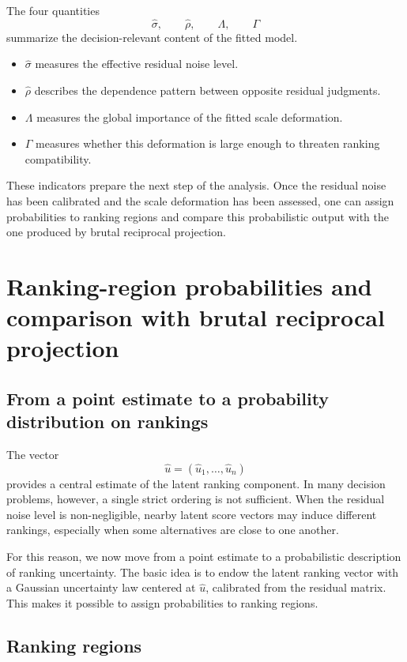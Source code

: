 \documentclass[11pt]{amsart}
\theoremstyle{definition}
\theoremstyle{plain}
\numberwithin{equation}{section}
\begin{document}
The four quantities
\[
\widehat\sigma,\qquad \widehat\rho,\qquad \Lambda,\qquad \Gamma
\]
summarize the decision-relevant content of the fitted model.

\begin{itemize}
\item $\widehat\sigma$ measures the effective residual noise level.
\item $\widehat\rho$ describes the dependence pattern between opposite residual judgments.
\item $\Lambda$ measures the global importance of the fitted scale deformation.
\item $\Gamma$ measures whether this deformation is large enough to threaten ranking compatibility.
\end{itemize}

These indicators prepare the next step of the analysis. Once the residual noise has been calibrated and the scale deformation has been assessed, one can assign probabilities to ranking regions and compare this probabilistic output with the one produced by brutal reciprocal projection.

\section{Ranking-region probabilities and comparison with brutal reciprocal projection}

\subsection{From a point estimate to a probability distribution on rankings}

The vector
\[
\widehat u=(\widehat u_1,\dots,\widehat u_n)
\]
provides a central estimate of the latent ranking component. In many decision problems, however, a single strict ordering is not sufficient. When the residual noise level is non-negligible, nearby latent score vectors may induce different rankings, especially when some alternatives are close to one another.

For this reason, we now move from a point estimate to a probabilistic description of ranking uncertainty. The basic idea is to endow the latent ranking vector with a Gaussian uncertainty law centered at $\widehat u$, calibrated from the residual matrix. This makes it possible to assign probabilities to ranking regions.

\subsection{Ranking regions}
\end{document}
